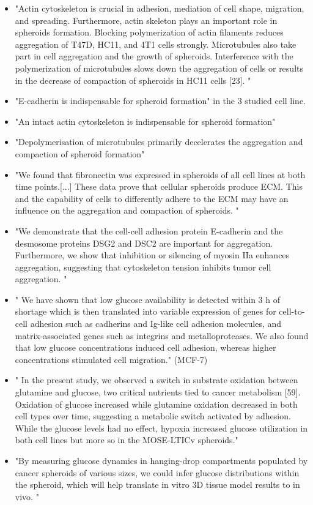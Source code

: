 \documentclass[11pt,a4paper]{article}
\begin{document}
\begin{itemize}
\item  "Actin cytoskeleton is crucial in adhesion, mediation of cell shape, migration, and spreading. Furthermore, actin skeleton plays an important role in spheroids formation. Blocking polymerization of actin filaments reduces aggregation of T47D, HC11, and 4T1 cells strongly. Microtubules also take part in cell aggregation and the growth of spheroids. Interference with the polymerization of microtubules slows down the aggregation of cells or results in the decrease of compaction of spheroids in HC11 cells [23]. "\cite{Bialkowska2020}
\item "E-cadherin is indispensable for spheroid formation" in the 3 studied cell line.\cite{Smyrek2018}
\item "An intact actin cytoskeleton is indispensable for spheroid formation" \cite{Smyrek2018}
\item "Depolymerisation of microtubules primarily decelerates the aggregation and compaction of spheroid formation" \cite{Smyrek2018}
\item "We found that fibronectin was expressed in spheroids of all cell lines at both time points.[...] These data prove that cellular spheroids produce ECM. This and the capability of cells to differently adhere to the ECM may have an influence on the aggregation and compaction of spheroids. "\cite{Smyrek2018}
\item "We demonstrate that the cell-cell adhesion protein E-cadherin and the desmosome proteins DSG2 and DSC2 are important for aggregation. Furthermore, we show that inhibition or silencing of myosin IIa enhances aggregation, suggesting that cytoskeleton tension inhibits tumor cell aggregation. "\cite{Saias2015}
\item "  We have shown that low glucose availability is detected within 3 h of shortage which is then translated into variable expression of genes for cell-to-cell adhesion such as cadherins and Ig-like cell adhesion molecules, and matrix-associated genes such as integrins and metalloproteases. We also found that low glucose concentrations induced cell adhesion, whereas higher concentrations stimulated cell migration." (MCF-7)\cite{Aftab2021}
\item " In the present study, we observed a switch in substrate oxidation between glutamine and glucose, two critical nutrients tied to cancer metabolism [59]. Oxidation of glucose increased while glutamine oxidation decreased in both cell types over time, suggesting a metabolic switch activated by adhesion. While the glucose levels had no effect, hypoxia increased glucose utilization in both cell lines but more so in the MOSE-LTICv spheroids." \cite{Compton2022}
\item "By measuring glucose dynamics in hanging-drop compartments populated by cancer spheroids of various sizes, we could infer glucose distributions within the spheroid, which will help translate in vitro 3D tissue model results to in vivo. "\cite{Rousset2022}
\end{itemize}
\end{document}
